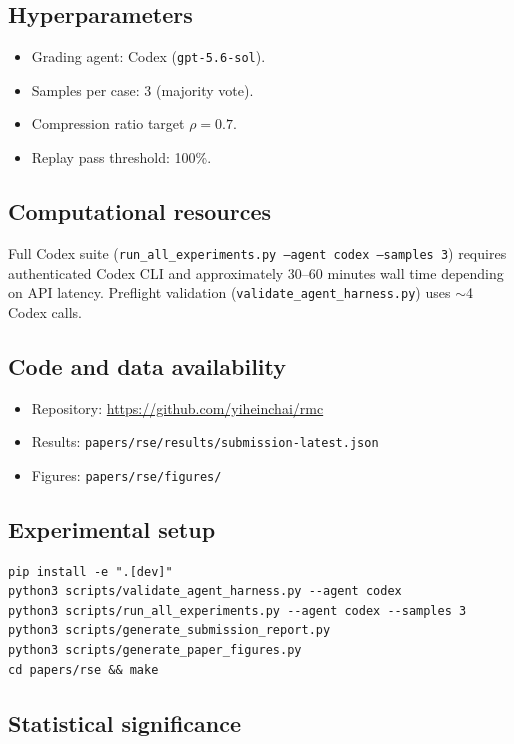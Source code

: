 \subsection{Hyperparameters}

\begin{itemize}
  \item Grading agent: Codex (\texttt{gpt-5.6-sol}).
  \item Samples per case: 3 (majority vote).
  \item Compression ratio target $\rho = 0.7$.
  \item Replay pass threshold: 100\%.
\end{itemize}

\subsection{Computational resources}

Full Codex suite (\texttt{run\_all\_experiments.py --agent codex --samples 3}) requires authenticated Codex CLI and approximately 30--60 minutes wall time depending on API latency.
Preflight validation (\texttt{validate\_agent\_harness.py}) uses $\sim$4 Codex calls.

\subsection{Code and data availability}

\begin{itemize}
  \item Repository: \url{https://github.com/yiheinchai/rmc}
  \item Results: \texttt{papers/rse/results/submission-latest.json}
  \item Figures: \texttt{papers/rse/figures/}
\end{itemize}

\subsection{Experimental setup}

\begin{verbatim}
pip install -e ".[dev]"
python3 scripts/validate_agent_harness.py --agent codex
python3 scripts/run_all_experiments.py --agent codex --samples 3
python3 scripts/generate_submission_report.py
python3 scripts/generate_paper_figures.py
cd papers/rse && make
\end{verbatim}

\subsection{Statistical significance}

